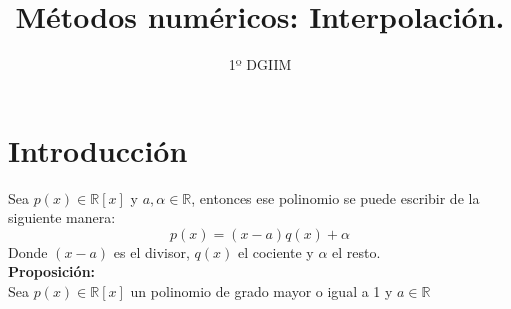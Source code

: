 \documentclass{article}
\title{\LARGE{\textbf{Métodos numéricos: Interpolación.}}}
\author{1º DGIIM}
\date{}
\begin{document}
\maketitle

\hrulefill

\section{Introducción}

Sea $p(x)\in\mathbb{R}[x]$ y $a,\alpha\in\mathbb{R}$, entonces ese polinomio se puede escribir de la siguiente manera:
$$p(x)=(x-a)q(x)+\alpha$$
Donde $(x-a)$ es el divisor, $q(x)$ el cociente y $\alpha$ el resto.
\\
\textbf{Proposición:}
\\
Sea $p(x)\in\mathbb{R}[x]$ un polinomio de grado mayor o igual a 1 y $a\in\mathbb{R}$
\end{document}
